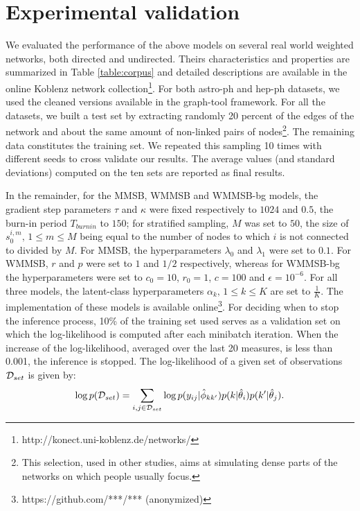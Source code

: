 \section{Experimental validation}
\label{sec:exps}

We evaluated the performance of the above models on several real world weighted networks, both directed and undirected. Theirs characteristics and properties are summarized in Table \ref{table:corpus} and detailed descriptions are available in the online Koblenz network collection\footnote{http://konect.uni-koblenz.de/networks/}. For both astro-ph and hep-ph datasets, we used the cleaned versions available in the  graph-tool framework.
 For all the datasets, we built a test set by extracting randomly 20 percent of the edges of the network and about the same amount of non-linked pairs of nodes\footnote{This selection, used in other studies, aims at simulating dense parts of the networks on which people usually focus.}. The remaining data constitutes the training set. We repeated this sampling 10 times with different seeds to cross validate our results. The average values (and standard deviations) computed on the ten sets are reported as final results.

\begin{table*}[t]
\bgroup
\def\arraystretch{1} %
	
\egroup
\label{table:corpus}
\end{table*}

In the remainder, for the MMSB, WMMSB and WMMSB-bg models, the gradient step parameters  $\tau$ and $\kappa$ were fixed respectively to  $1024$ and $0.5$, the burn-in period $T_{burnin}$ to $150$; for stratified sampling, $M$ was set to $50$, the size of $s_0^{i,m}, \, 1 \le m \le M$ being equal to the number of nodes to which $i$ is not connected to divided by $M$. For MMSB, the hyperparameters $\lambda_0$ and $\lambda_1$ were set to $0.1$. For WMMSB, $r$ and $p$ were set to $1$ and $1/2$ respectively, whereas for WMMSB-bg the hyperparameters were set to  $c_0=10$, $r_0=1$, $c=100$ and $\epsilon=10^{-6}$. For all three models, the latent-class hyperparameters $\alpha_k, \, 1 \le k \le K$ are set to $\frac{1}{K}$. The implementation of these models is available online\footnote{https://github.com/***/*** (anonymized)}. For deciding when to stop the inference process, 10\% of the training set used serves as a validation set on which the log-likelihood is computed after each minibatch iteration. When the increase of the log-likelihood, averaged over the last 20 measures, is less than 0.001, the inference is stopped. The log-likelihood of a given set of observations $\mathcal{D}_{set}$  is given by:
%
\begin{equation*}
\log p(\mathcal{D}_{set}) = \sum_{i,j \in \mathcal{D}_{set}} \log p(y_{ij} | \hat\phi_{kk'}) p(k|\hat\theta_i) p(k'|\hat\theta_j).
\end{equation*}
%

